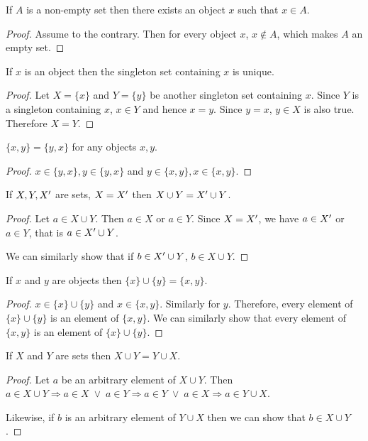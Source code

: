 \begin{lem}\label{c2s1l2}
If $A$ is a non-empty set then there exists an object $x$ such that $x \in
A$.
\end{lem}
\begin{proof}
Assume to the contrary. Then for every object $x$, $x \notin A$, which 
makes $A$ an empty set.
\end{proof}

\begin{lem}\label{c2s1l3}
If $x$ is an object then the singleton set containing $x$ is unique.
\end{lem}
\begin{proof}
Let $X = \{x\}$ and $Y = \{y\}$ be another singleton set containing $x$.
Since $Y$ is a singleton containing $x$, $x \in Y$ and hence $x = y$. Since
$y = x$, $y \in X$ is also true. Therefore $X = Y$.
\end{proof}

\begin{lem}\label{c2s1l4}
$\{x, y\} = \{y, x\}$ for any objects $x, y$.
\end{lem}
\begin{proof}
$x \in \{y, x\}, y \in \{y, x\}$ and $y \in \{x, y\}, x \in \{x, y\}$.
\end{proof}

\begin{lem}\label{c2s1l5}
If $X, Y, X^\prime$ are sets, $X = X^\prime$ then $X \cup Y = X^\prime \cup Y$.
\end{lem}
\begin{proof}
Let $a \in X \cup Y$. Then $a \in X$ or $a \in Y$. Since $X = X^\prime$, we
have $a \in X^\prime$ or $a \in Y$, that is $a \in X^\prime \cup Y$.

We can similarly show that if $b \in X^\prime \cup Y$, $b \in X \cup Y$.
\end{proof}

\begin{lem}\label{c2s1l6}
If $x$ and $y$ are objects then $\{x\} \cup \{y\} = \{x, y\}$.
\end{lem}
\begin{proof}
$x \in \{x\} \cup \{y\}$ and $x \in \{x, y\}$. Similarly for $y$. 
Therefore, every element of $\{x\} \cup \{y\}$ is an element of $\{x, y\}$.
We can similarly show that every element of $\{x, y\}$ is an element of
$\{x\} \cup \{y\}$.
\end{proof}

\begin{lem}\label{c2s1l7}
If $X$ and $Y$ are sets then $X \cup Y = Y \cup X$.
\end{lem}
\begin{proof}
Let $a$ be an arbitrary element of $X \cup Y$. Then
$a \in X \cup Y \Rightarrow a \in X \;\lor\; a \in Y \Rightarrow a \in Y
\;\lor\; a \in X \Rightarrow a \in Y \cup X$.

Likewise, if $b$ is an arbitrary element of $Y \cup X$ then we can show 
that $b \in X \cup Y$.
\end{proof}

